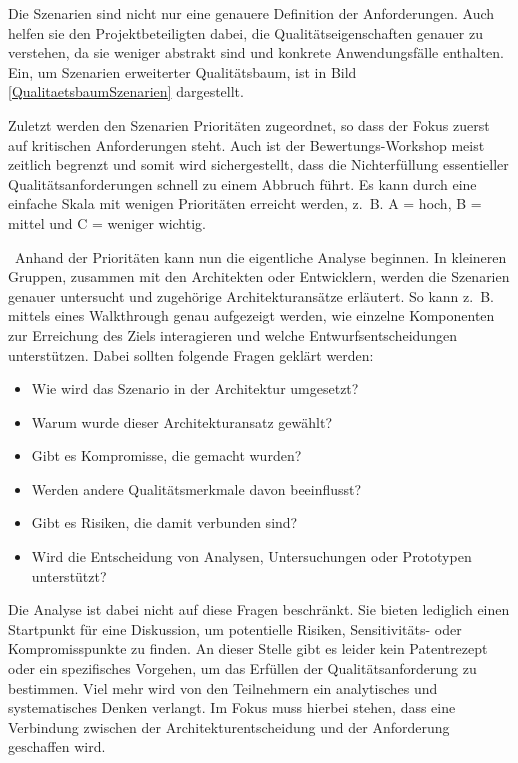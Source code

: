 Die Szenarien sind nicht nur eine genauere Definition der Anforderungen. Auch helfen sie den Projektbeteiligten dabei, die Qualitätseigenschaften genauer zu verstehen, da sie weniger abstrakt sind und konkrete Anwendungsfälle enthalten. Ein, um Szenarien erweiterter Qualitätsbaum, ist in Bild \ref{QualitaetsbaumSzenarien} dargestellt.


Zuletzt werden den Szenarien Prioritäten zugeordnet, so dass der Fokus zuerst auf kritischen Anforderungen steht. Auch ist der Bewertungs-Workshop meist zeitlich begrenzt und somit wird sichergestellt, dass die Nichterfüllung essentieller Qualitätsanforderungen schnell zu einem Abbruch führt. Es kann durch eine einfache Skala mit wenigen Prioritäten erreicht werden, z.~B. A = hoch, B = mittel und C = weniger wichtig.

\
Anhand der Prioritäten kann nun die eigentliche Analyse beginnen. In kleineren Gruppen, zusammen mit den Architekten oder Entwicklern, werden die Szenarien genauer untersucht und zugehörige Architekturansätze erläutert.
So kann z.~B. mittels eines Walkthrough genau aufgezeigt werden, wie einzelne Komponenten zur Erreichung des Ziels interagieren und welche Entwurfsentscheidungen unterstützen\cite{Starke2015}. Dabei sollten folgende Fragen geklärt werden: 

\begin{itemize}
	\item Wie wird das Szenario in der Architektur umgesetzt?
	\item Warum wurde dieser Architekturansatz gewählt?
	\item Gibt es Kompromisse, die gemacht wurden?
	\item Werden andere Qualitätsmerkmale davon beeinflusst?
	\item Gibt es Risiken, die damit verbunden sind?
	\item Wird die Entscheidung von Analysen, Untersuchungen oder Prototypen unterstützt?
\end{itemize}

Die Analyse ist dabei nicht auf diese Fragen beschränkt. Sie bieten lediglich einen Startpunkt für eine Diskussion, um potentielle Risiken, Sensitivitäts- oder Kompromisspunkte zu finden. An dieser Stelle gibt es leider kein Patentrezept oder ein spezifisches Vorgehen, um das Erfüllen der Qualitätsanforderung zu bestimmen. Viel mehr wird von den Teilnehmern ein analytisches und systematisches Denken verlangt. Im Fokus muss hierbei stehen, dass eine Verbindung zwischen der Architekturentscheidung und der Anforderung geschaffen wird.

